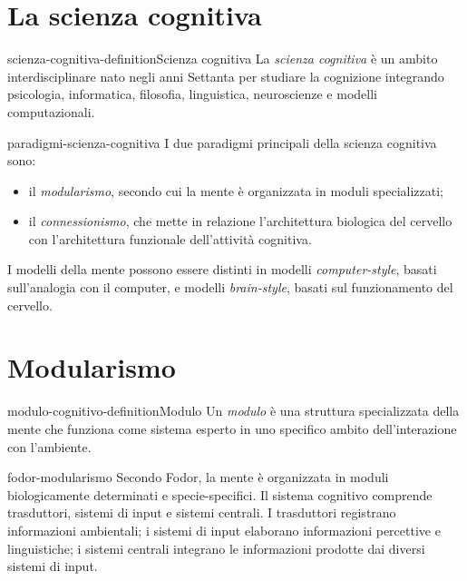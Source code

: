 \documentclass[preview]{standalone}
\begin{document}
\genpage

\section{La scienza cognitiva}

\begin{snippetdefinition}{scienza-cognitiva-definition}{Scienza cognitiva}
    La \emph{scienza cognitiva} è un ambito interdisciplinare nato negli anni
    Settanta per studiare la cognizione integrando psicologia, informatica,
    filosofia, linguistica, neuroscienze e modelli computazionali.
\end{snippetdefinition}

\begin{snippet}{paradigmi-scienza-cognitiva}
    I due paradigmi principali della scienza cognitiva sono:
    \begin{itemize}
        \item il \emph{modularismo}, secondo cui la mente è organizzata in
        moduli specializzati;
        \item il \emph{connessionismo}, che mette in relazione l'architettura
        biologica del cervello con l'architettura funzionale dell'attività
        cognitiva.
    \end{itemize}
    I modelli della mente possono essere distinti in modelli
    \emph{computer-style}, basati sull'analogia con il computer, e modelli
    \emph{brain-style}, basati sul funzionamento del cervello.
\end{snippet}

\section{Modularismo}

\begin{snippetdefinition}{modulo-cognitivo-definition}{Modulo}
    Un \emph{modulo} è una struttura specializzata della mente che funziona
    come sistema esperto in uno specifico ambito dell'interazione con
    l'ambiente.
\end{snippetdefinition}

\begin{snippet}{fodor-modularismo}
    Secondo Fodor, la mente è organizzata in moduli biologicamente determinati
    e specie-specifici. Il sistema cognitivo comprende trasduttori, sistemi di
    input e sistemi centrali. I trasduttori registrano informazioni
    ambientali; i sistemi di input elaborano informazioni percettive e
    linguistiche; i sistemi centrali integrano le informazioni prodotte dai
    diversi sistemi di input.
\end{snippet}
\end{document}
